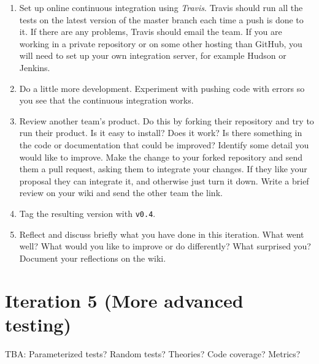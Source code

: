 \documentclass[swedish,english]{article}
\begin{document}
\begin{enumerate}
\item Set up online continuous integration using \emph{Travis}. Travis should run all the tests on the latest version of the master branch each time a push is done to it. If there are any problems, Travis should email the team. If you are working in a private repository or on some other hosting than GitHub, you will need to set up your own integration server, for example Hudson or Jenkins.
\item Do a little more development. Experiment with pushing code with errors so you see that the continuous integration works.
\item Review another team's product. Do this by forking their repository and try to run their product. Is it easy to install? Does it work? Is there something in the code or documentation that could be improved? Identify some detail you would like to improve. Make the change to your forked repository and send them a pull request, asking them to integrate your changes. If they like your proposal they can integrate it, and otherwise just turn it down. Write a brief review on your wiki and send the other team the link.
\item Tag the resulting version with \verb'v0.4'.
\item Reflect and discuss briefly what you have done in this iteration. What went well? What would you like to improve or do differently? What surprised you? Document your reflections on the wiki.
\end{enumerate}

\section*{Iteration 5 (More advanced testing)}

TBA: 
Parameterized tests?
Random tests?
Theories?
Code coverage?
Metrics?
\end{document}
